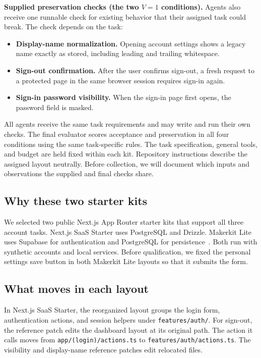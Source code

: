 \documentclass[11pt,a4paper]{article}
\begin{document}
\noindent\textbf{Supplied preservation checks (the two $V=1$ conditions).}
Agents also receive one runnable check for existing behavior that their assigned task could break. The check depends on the task:
\begin{itemize}
\item \textbf{Display-name normalization.} Opening account settings shows a legacy name exactly as stored, including leading and trailing whitespace.
\item \textbf{Sign-out confirmation.} After the user confirms sign-out, a fresh request to a protected page in the same browser session requires sign-in again.
\item \textbf{Sign-in password visibility.} When the sign-in page first opens, the password field is masked.
\end{itemize}

All agents receive the same task requirements and may write and run their own checks. The final evaluator scores acceptance and preservation in all four conditions using the same task-specific rules. The task specification, general tools, and budget are held fixed within each kit. Repository instructions describe the assigned layout neutrally. Before collection, we will document which inputs and observations the supplied and final checks share.

\subsection{Why these two starter kits}
We selected two public Next.js App Router starter kits that support all three account tasks. Next.js SaaS Starter uses PostgreSQL and Drizzle. Makerkit Lite uses Supabase for authentication and PostgreSQL for persistence~\cite{nextjsSaasStarter,makerkitLite}. Both run with synthetic accounts and local services. Before qualification, we fixed the personal settings save button in both Makerkit Lite layouts so that it submits the form.

\subsection{What moves in each layout}
In Next.js SaaS Starter, the reorganized layout groups the login form, authentication actions, and session helpers under \texttt{features/auth/}. For sign-out, the reference patch edits the dashboard layout at its original path. The action it calls moves from \texttt{app/(login)/actions.ts} to \texttt{features/auth/actions.ts}. The visibility and display-name reference patches edit relocated files.
\end{document}
